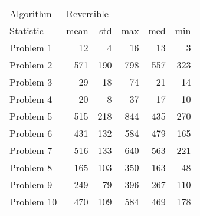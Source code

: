 \begin{tabular}{lrrrrr}
\toprule
Algorithm & \multicolumn{5}{l}{Reversible} \\
Statistic &       mean &  std &  max &  med &  min \\
\midrule
Problem 1  &         12 &    4 &   16 &   13 &    3 \\
Problem 2  &        571 &  190 &  798 &  557 &  323 \\
Problem 3  &         29 &   18 &   74 &   21 &   14 \\
Problem 4  &         20 &    8 &   37 &   17 &   10 \\
Problem 5  &        515 &  218 &  844 &  435 &  270 \\
Problem 6  &        431 &  132 &  584 &  479 &  165 \\
Problem 7  &        516 &  133 &  640 &  563 &  221 \\
Problem 8  &        165 &  103 &  350 &  163 &   48 \\
Problem 9  &        249 &   79 &  396 &  267 &  110 \\
Problem 10 &        470 &  109 &  584 &  469 &  178 \\
\bottomrule
\end{tabular}
